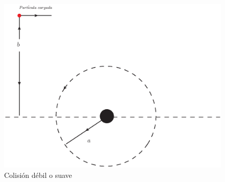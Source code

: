 \begin{figure}[htbp]
   \centering
   \includegraphics[width=.65\linewidth]{./Figures/softcoli.eps}
   \caption{Colisión débil o suave}
   \label{fig:cd}
\end{figure}
